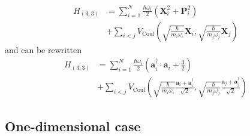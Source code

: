 \documentclass[reprint, amsmath, amssymb, aps]{revtex4-2}
\begin{document}
        \begin{equation}
        \begin{split}
            H_{(3,3)} &= \sum_{i=1}^N\frac{\hbar\omega_i}{2}\left(\bm X_{i}^2 + \bm P_{i}^2\right) \\
            & + \sum_{i<j}V_\text{Coul}\left(\sqrt{\frac{\hbar}{m_i\omega_i}}\bm{X} _i, \sqrt{\frac{\hbar}{m_j\omega_j}}\bm{X} _j\right)
        \end{split}
        \end{equation}
        and can be rewritten
        \begin{equation}
        \begin{split}
            H_{(3,3)} &= \sum_{i=1}^N\frac{\hbar\omega_i}{2}\left(\bm a_{i}^\dagger\cdot\bm a_{i} +\frac{3}{2}\right) \\
            & + \sum_{i<j}V_\text{Coul}\left(\sqrt{\frac{\hbar}{m_i\omega_i}}\frac{\bm a_i + \bm a_i^\dagger}{\sqrt 2}, \sqrt{\frac{\hbar}{m_j\omega_j}}\frac{\bm a_j + \bm a_j^\dagger}{\sqrt 2}\right)
        \end{split}
        \end{equation}
    \subsection{One-dimensional case}
\end{document}
